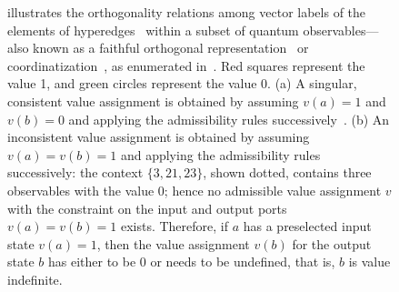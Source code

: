 \documentclass[%
 superscriptaddress,
  preprint,
 showpacs,
 showkeys,
 nofootinbib,
  amsmath,amssymb,
 pra,
  longbibliography,
  floatfix,
 ]{revtex4-2}
\theoremstyle{definition}
\begin{document}
\begin{figure}
{illustrates the orthogonality relations among vector labels of the elements of hyperedges~\cite{lovasz-79} within a subset of quantum observables---also known as a faithful orthogonal representation~\cite{Portillo-2015} or coordinatization~\cite{Pavii2018}, as enumerated in~\cite[Table~I]{2018-minimalYIYS}. Red squares represent the value 1, and green circles represent the value 0.
(a) A singular, consistent value assignment is obtained by assuming $v(a)=1$ and $v(b)=0$ and applying the admissibility rules successively~\cite[Figure~(24.2.a)]{Svozil-2018-p}.
(b) An inconsistent value assignment is obtained by assuming $v(a)=v(b)=1$ and applying the admissibility rules successively:
 the context $\{3,21,23\}$, shown dotted, contains three observables with the value 0; hence no admissible value assignment $v$
with the constraint on the input and output ports $v(a)=v(b)=1$ exists. Therefore, if $a$ has a preselected input state $v(a)=1$,
then the value assignment $v(b)$ for the output state $b$ has either to be 0 or needs to be undefined, that is, $b$ is value indefinite.
}
                \label{2023-viext-TIFS}
        \end{figure}






\end{document}
